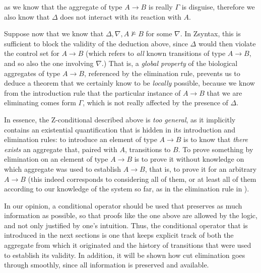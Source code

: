 as we know that the aggregate of type $A \rightarrow B$ is really $\Gamma$ is
disguise, therefore we also know that $\Delta$ does not interact with its
reaction with $A$.

Suppose now that we know that $\Delta, \nabla, A \not \models B$ for some
$\nabla$. In Zsyntax, this is sufficient to block the validity of the deduction
above, since $\Delta$ would then violate the control set for $A \rightarrow B$
(which refers to \emph{all} known transitions of type $A \rightarrow B$, and so
also the one involving $\nabla$.) That is, a \emph{global property} of the
biological aggregates of type $A \rightarrow B$, referenced by the elimination
rule, prevents us to deduce a theorem that we certainly know to be
\emph{locally} possible, because we know from the introduction rule that the
particular instance of $A \rightarrow B$ that we are eliminating comes form
$\Gamma$, which is not really affected by the presence of $\Delta$.

In essence, the Z-conditional described above is \emph{too general}, as it
implicitly contains an existential quantification that is hidden in its
introduction and elimination rules: to introduce an element of
type $A \rightarrow B$ is to know that \emph{there exists} an aggregate that,
paired with $A$, transitions to $B$. To prove something by elimination on an
element of type $A \rightarrow B$ is to prove it without knowledge on which
aggregate was used to establish $A \rightarrow B$, that is, to prove it for an
arbitrary $A \rightarrow B$ (this indeed corresponds to considering all of them,
or at least all of them according to our knowledge of the system so far, as in
the elimination rule in \cite{adding-logic}).

In our opinion, a conditional operator should be used that preserves as much
information as possible, so that proofs like the one above are allowed by the
logic, and not only justified by one's intuition. Thus, the conditional operator
that is introduced in the next sections is one that keeps explicit track of both
the aggregate from which it originated and the history of transitions that were
used to establish its validity. In addition, it will be shown how cut
elimination goes through smoothly, since all information is preserved and
available.


